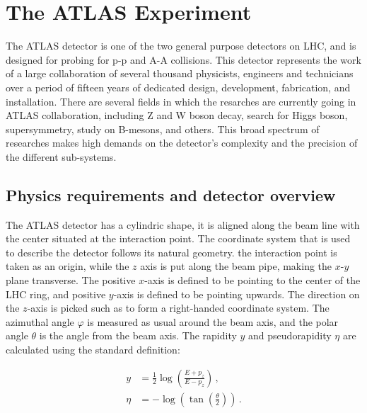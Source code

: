 \chapter{The ATLAS Experiment}
\label{sec:ATLAS}

The ATLAS detector is one of the two general purpose detectors on LHC, and is designed for probing for p-p and A-A collisions.
This detector represents the work of a large collaboration of several thousand physicists, engineers and technicians over a period of fifteen years of dedicated design, development, fabrication, and installation. There are several fields in which the resarches are currently going in ATLAS collaboration, including Z and W boson decay, search for Higgs boson,
supersymmetry, study on B-mesons, and others. This broad spectrum of researches makes high demands on the detector's complexity and the precision
of the different sub-systems.

\section{Physics requirements and detector overview}
\label{sec:ATLAS_overview}
The ATLAS detector has a cylindric shape, it is aligned along the beam line with the center situated at the interaction point.
The coordinate system that is used to describe the detector follows its natural geometry. the interaction point is taken as an origin,
while the $z$ axis is put along the beam pipe, making the $x$-$y$ plane transverse. The positive $x$-axis is defined to be pointing to the center
of the LHC ring, and positive $y$-axis is defined to be pointing upwards. The direction on the $z$-axis is picked such as to form a right-handed coordinate system.
The azimuthal angle $\varphi$ is measured as usual around the beam axis, and the polar angle $\theta$ is the angle from the beam axis. The rapidity $y$ and pseudorapidity $\eta$
are calculated using the standard definition:

\begin{align}
y &= \frac{1}{2} \log \left(\frac{E+p_z}{E-p_z}\right)\,, \\
\eta &= - \log (\tan (\frac{\theta}{2}))\,.
\end{align}

\begin{figure}
\end{figure}

